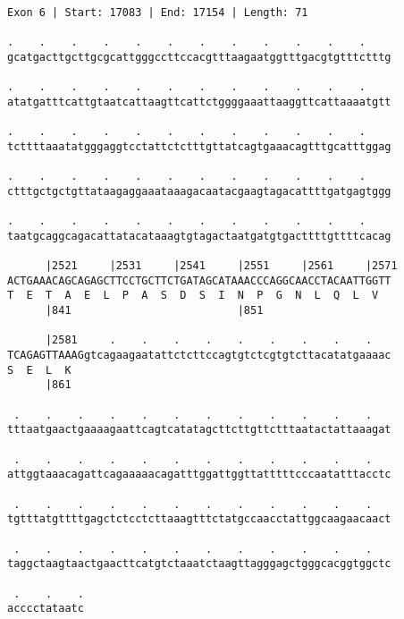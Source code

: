 \documentclass{article}
\begin{document}
\newpage
\begin{Verbatim}
Exon 6 | Start: 17083 | End: 17154 | Length: 71
 
.    .    .    .    .    .    .    .    .    .    .    .    
gcatgacttgcttgcgcattgggccttccacgtttaagaatggtttgacgtgtttctttg
  
.    .    .    .    .    .    .    .    .    .    .    .    
atatgatttcattgtaatcattaagttcattctggggaaattaaggttcattaaaatgtt
  
.    .    .    .    .    .    .    .    .    .    .    .    
tcttttaaatatgggaggtcctattctctttgttatcagtgaaacagtttgcatttggag
  
.    .    .    .    .    .    .    .    .    .    .    .    
ctttgctgctgttataagaggaaataaagacaatacgaagtagacattttgatgagtggg
  
.    .    .    .    .    .    .    .    .    .    .    .    
taatgcaggcagacattatacataaagtgtagactaatgatgtgacttttgttttcacag
  
      |2521     |2531     |2541     |2551     |2561     |2571
ACTGAAACAGCAGAGCTTCCTGCTTCTGATAGCATAAACCCAGGCAACCTACAATTGGTT
T  E  T  A  E  L  P  A  S  D  S  I  N  P  G  N  L  Q  L  V  
      |841                          |851                    
  
      |2581     .    .    .    .    .    .    .    .    .   
TCAGAGTTAAAGgtcagaagaatattctcttccagtgtctcgtgtcttacatatgaaaac
S  E  L  K                                                  
      |861                                                  
  
 .    .    .    .    .    .    .    .    .    .    .    .   
tttaatgaactgaaaagaattcagtcatatagcttcttgttctttaatactattaaagat
  
 .    .    .    .    .    .    .    .    .    .    .    .   
attggtaaacagattcagaaaaacagatttggattggttatttttcccaatatttacctc
  
 .    .    .    .    .    .    .    .    .    .    .    .   
tgtttatgttttgagctctcctcttaaagtttctatgccaacctattggcaagaacaact
  
 .    .    .    .    .    .    .    .    .    .    .    .   
taggctaagtaactgaacttcatgtctaaatctaagttagggagctgggcacggtggctc
  
 .    .    .
acccctataatc
\end{Verbatim}
\newpage
\end{document}
